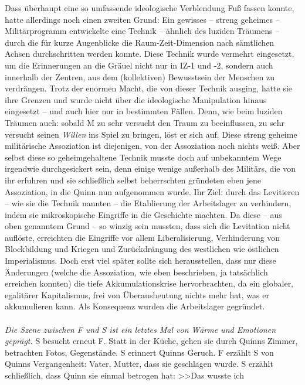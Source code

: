 Dass überhaupt eine so umfassende ideologische Verblendung Fuß fassen konnte,
hatte allerdings noch einen zweiten Grund: 
Ein gewisses -- streng geheimes -- Militärprogramm entwickelte eine Technik --
ähnlich des luziden Träumens -- durch die für kurze Augenblicke die
Raum-Zeit-Dimension nach sämtlichen Achsen durchschritten werden konnte.
Diese Technik wurde vermehrt eingesetzt, um die Erinnerungen an die Gräuel nicht
nur in IZ-1 und -2, sondern auch innerhalb der Zentren, aus dem (kollektiven)
Bewusstsein der Menschen zu verdrängen. 
Trotz der enormen Macht, die von dieser Technik ausging, hatte sie ihre Grenzen
und wurde nicht über die ideologische Manipulation hinaus eingesetzt -- und auch
hier nur in bestimmten Fällen. Denn, wie beim luziden Träumen auch: sobald M zu
sehr versucht den Traum zu beeinflussen, zu sehr versucht seinen \emph{Willen}
ins Spiel zu bringen, löst er sich auf. 
Diese streng geheime militärische Assoziation ist diejenigen, von der 
Assoziation noch nichts weiß. 
Aber selbst diese so geheimgehaltene Technik musste doch auf unbekanntem Wege 
irgendwie durchgesickert sein, denn einige wenige außerhalb des Militärs, die
von ihr erfuhren und sie schließlich selbst beherrschten gründeten eben jene
Assoziation, in die Quinn nun aufgenommen wurde. 
Ihr Ziel: durch das Levitieren -- wie sie die Technik nannten -- die Etablierung
der Arbeitslager zu verhindern, indem sie mikroskopische Eingriffe in die
Geschichte machten. 
Da diese -- aus oben genanntem Grund -- so winzig sein mussten, dass sich die
Levitation nicht auflöste, erreichten die Eingriffe vor allem Liberalisierung,
Verhinderung von Blockbildung und Kriegen und Zurückdrängung des westlichen wie
östlichen Imperialismus.
Doch erst viel später sollte sich herausstellen, dass nur diese Änderungen
(welche die Assoziation, wie eben beschrieben, ja tatsächlich erreichen konnten) 
die tiefe Akkumulationskrise hervorbrachten, da ein globaler, egalitärer
Kapitalismus, frei von Überausbeutung nichts mehr hat, was er akkumulieren kann. 
Als Konsequenz wurden die Arbeitslager gegründet.\\\\
%
\emph{Die Szene zwischen F und S ist ein letztes Mal von Wärme und Emotionen}
\emph{geprägt.}
S besucht erneut F. 
Statt in der Küche, gehen sie durch Quinns Zimmer, betrachten Fotos,
Gegenstände. 
S erinnert Quinns Geruch. 
F erzählt S von Quinns Vergangenheit: Vater, Mutter, dass sie geschlagen wurde. 
S erzählt schließlich, dass Quinn sie einmal betrogen hat: >>Das wusste ich

